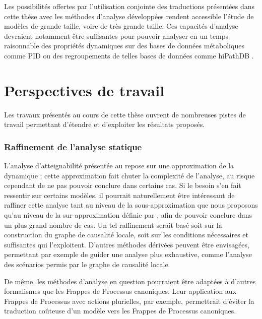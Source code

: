 \myskip

Les possibilités offertes par l'utilisation conjointe des traductions présentées
dans cette thèse avec les méthodes d'analyse développées
rendent accessible l'étude de modèles de grande taille, voire de très grande taille.
Ces capacités d'analyse devraient notamment être suffisantes pour pouvoir analyser
en un temps raisonnable des propriétés dynamiques sur des bases de données métaboliques
comme PID \cite{schaefer09pid}
ou des regroupements de telles bases de données comme hiPathDB \cite{yu12hipathdb}.



\section{Perspectives de travail}

Les travaux présentés au cours de cette thèse ouvrent de nombreuses pistes de travail
permettant d'étendre et d'exploiter les résultats proposés.

% 



\subsubsection*{Raffinement de l'analyse statique}

L'analyse d'atteignabilité présentée au 
repose sur une approximation de la dynamique ;
cette approximation fait chuter la complexité de l'analyse,
au risque cependant de ne pas pouvoir conclure dans certains cas.
Si le besoin s'en fait ressentir sur certains modèles,
il pourrait naturellement être intéressant de raffiner cette analyse tant au niveau
de la sous-approximation que nous proposons qu'au niveau
de la sur-approximation définie par ,
afin de pouvoir conclure dans un plus grand nombre de cas.
Un tel raffinement serait basé soit sur la construction du graphe de causalité locale,
soit sur les conditions nécessaires et suffisantes qui l'exploitent.
D'autres méthodes dérivées peuvent être envisagées,
permettant par exemple de guider une analyse plus exhaustive,
comme l'analyse des scénarios permis par le graphe de causalité locale.

De même, les méthodes d'analyse en question pourraient être adaptées à d'autres formalismes
que les Frappes de Processus canoniques.
Leur application aux Frappes de Processus avec actions plurielles, par exemple,
permettrait d'éviter la traduction coûteuse d'un modèle vers les Frappes de Processus canoniques.

